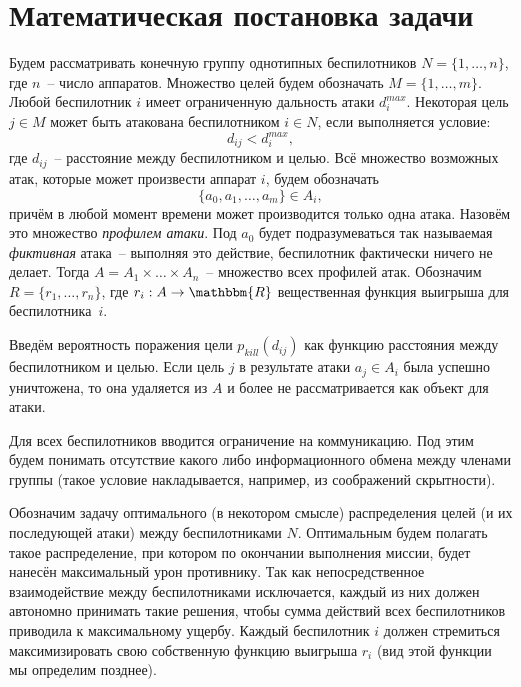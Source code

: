 \section{Математическая постановка задачи}

Будем рассматривать конечную группу однотипных беспилотников $ N = \{1, \dots, n\} $, где $ n $~-- число аппаратов.
Множество целей будем обозначать $ M = \{1, \dots, m\} $.
Любой беспилотник $ i $ имеет ограниченную дальность атаки $ d_{i}^{max} $.
Некоторая цель $ j \in M $ может быть атакована беспилотником $ i \in N $, если выполняется условие:
\begin{equation} \label{eq:ineq-distance}
    d_{ij} < d_{i}^{max} ,
\end{equation}
где $ d_{ij} $~-- расстояние между беспилотником и целью.
Всё множество возможных атак, которые может произвести аппарат $ i $, будем обозначать 
\begin{equation}
    \{a_0, a_1, \dots, a_m\} \in A_i ,
\end{equation}
причём в любой момент времени может производится только одна атака.
Назовём это множество \textit{профилем атаки}.
Под $ a_0 $ будет подразумеваться так называемая \textit{фиктивная} атака~-- выполняя это действие, беспилотник фактически ничего не делает.
Тогда $ A = A_1 \times \dots \times A_n $~-- множество всех профилей атак.
Обозначим $ R = \{r_1, \dots, r_n\} $, где $ r_i: A \rightarrow \mathbbm{R} $ вещественная функция выигрыша для беспилотника~$ i $.

Введём вероятность поражения цели $ p_{kill}(d_{ij}) $ как функцию расстояния между беспилотником и целью.
Если цель $ j $ в результате атаки $ a_j \in A_i $ была успешно уничтожена, то она удаляется из $ A $ и более не рассматривается как объект для атаки.

Для всех беспилотников вводится ограничение на коммуникацию.
Под этим будем понимать отсутствие какого либо информационного обмена между членами группы (такое условие накладывается, например, из соображений скрытности).

Обозначим задачу оптимального (в некотором смысле) распределения целей (и их последующей атаки) между беспилотниками $ N $.
Оптимальным будем полагать такое распределение, при котором по окончании выполнения миссии, будет нанесён максимальный урон противнику.
Так как непосредственное взаимодействие между беспилотниками исключается, каждый из них должен автономно принимать такие решения, чтобы сумма действий всех беспилотников приводила к максимальному ущербу.
Каждый беспилотник $ i $ должен стремиться максимизировать свою собственную функцию выигрыша $ r_i $ (вид этой функции мы определим позднее).


